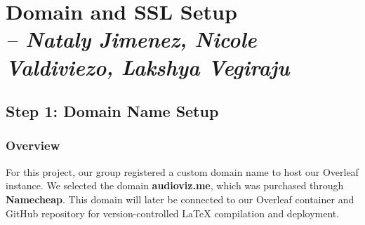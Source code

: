 \chapter{Domain and SSL Setup \\
\small{\textit{-- Nataly Jimenez, Nicole Valdiviezo, Lakshya Vegiraju}}
\label{Chapter::DomainSSL Setup}}

\section{Step 1: Domain Name Setup}

\subsection{Overview}
For this project, our group registered a custom domain name to host our Overleaf instance. We selected the domain \textbf{audioviz.me}, which was purchased through \textbf{Namecheap}. This domain will later be connected to our Overleaf container and GitHub repository for version-controlled LaTeX compilation and deployment.

